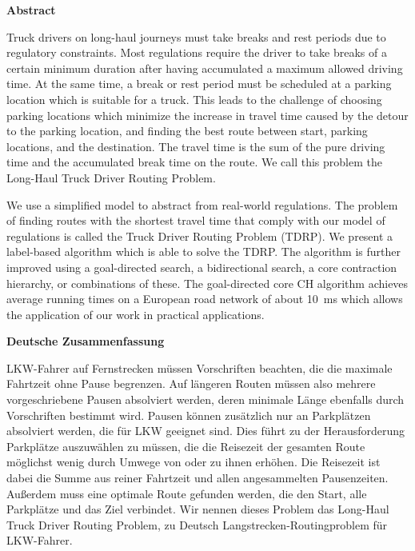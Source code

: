 \documentclass{thesisclass}
\begin{document}
\begin{addmargin}{0.5cm}
	\centerline{\textbf{Abstract}}

	Truck drivers on long-haul journeys must take breaks and rest periods due to regulatory constraints. Most regulations require the driver to take breaks of a certain minimum duration after having accumulated a maximum allowed driving time. At the same time, a break or rest period must be scheduled at a parking location which is suitable for a truck. This leads to the challenge of choosing parking locations which minimize the increase in travel time caused by the detour to the parking location, and finding the best route between start, parking locations, and the destination. The travel time is the sum of the pure driving time and the accumulated break time on the route. We call this problem the Long-Haul Truck Driver Routing Problem.

	We use a simplified model to abstract from real-world regulations. The problem of finding routes with the shortest travel time that comply with our model of regulations is called the Truck Driver Routing Problem (TDRP). We present a label-based algorithm which is able to solve the TDRP. The algorithm is further improved using a goal-directed search, a bidirectional search, a core contraction hierarchy, or combinations of these. The goal-directed core CH algorithm achieves average running times on a European road network of about \SI{10}{\milli\second} which allows the application of our work in practical applications.

	\vskip 2cm

	\centerline{\textbf{Deutsche Zusammenfassung}}
	LKW-Fahrer auf Fernstrecken müssen Vorschriften beachten, die die maximale Fahrtzeit ohne Pause begrenzen. Auf längeren Routen müssen also mehrere vorgeschriebene Pausen absolviert werden, deren minimale Länge ebenfalls durch Vorschriften bestimmt wird. Pausen können zusätzlich nur an Parkplätzen absolviert werden, die für LKW geeignet sind. Dies führt zu der Herausforderung Parkplätze auszuwählen zu müssen, die die Reisezeit der gesamten Route möglichst wenig durch Umwege von oder zu ihnen erhöhen. Die Reisezeit ist dabei die Summe aus reiner Fahrtzeit und allen angesammelten Pausenzeiten. Außerdem muss eine optimale Route gefunden werden, die den Start, alle Parkplätze und das Ziel verbindet. Wir nennen dieses Problem das \glqq Long-Haul Truck Driver Routing Problem\grqq, zu Deutsch \glqq Langstrecken-Routingproblem für LKW-Fahrer\grqq.


\end{addmargin}
\end{document}

